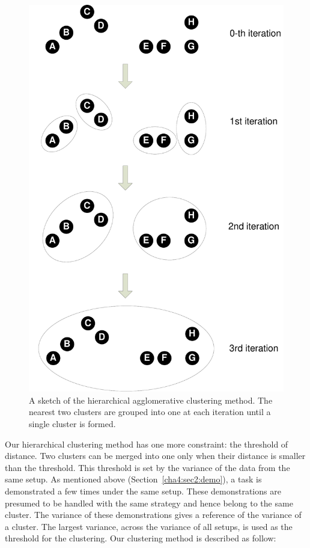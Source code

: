 \begin{figure}
  \centering
   \includegraphics[width=12cm]{./fig_cha4/hierarchicalclustering.pdf}
  \caption{ \scriptsize{A sketch of the hierarchical agglomerative clustering method. The nearest two clusters are grouped into one at each iteration until a single cluster is formed.}
}
\label{fig:hcluster}
\end{figure}

Our hierarchical clustering method has one more constraint: the threshold of distance. Two clusters can be merged into one only when their distance is smaller than the threshold. This threshold is set by the variance of the data from the same setup. As mentioned above (Section~\ref{cha4:sec2:demo}), a task is demonstrated a few times under the same setup. These demonstrations are presumed to be handled with the same strategy and hence belong to the same cluster. The variance of these demonstrations gives a reference of the variance of a cluster. The largest variance, across the variance of all setups, is used as the threshold for the clustering. Our clustering method is described as follow:

